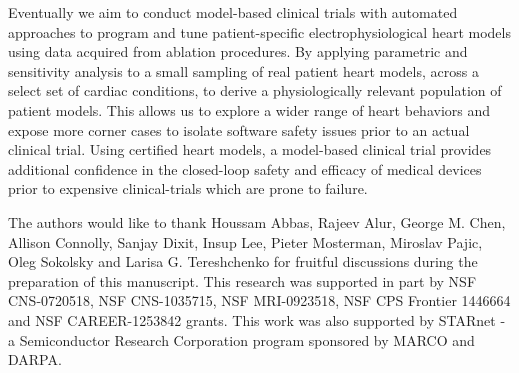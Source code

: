 Eventually we aim to conduct model-based clinical trials with automated approaches to program and tune patient-specific electrophysiological heart models using data acquired from ablation procedures. By applying parametric and sensitivity analysis to a small sampling of real patient heart models, across a select set of cardiac conditions, to derive a physiologically relevant population of patient models. This allows us to explore a wider range of heart behaviors and expose more corner cases to isolate software safety issues prior to an actual clinical trial. Using certified heart models, a model-based clinical trial provides additional confidence in the closed-loop safety and efficacy of medical devices prior to expensive clinical-trials which are prone to failure. 

\begin{acknowledgements}
The authors would like to thank Houssam Abbas, Rajeev Alur, George M. Chen, Allison Connolly, Sanjay Dixit, Insup Lee, Pieter Mosterman, Miroslav Pajic, Oleg Sokolsky and Larisa G. Tereshchenko for fruitful discussions during the preparation of this manuscript. This research was supported in part by NSF CNS-0720518, NSF CNS-1035715, NSF MRI-0923518, NSF CPS Frontier 1446664 and NSF CAREER-1253842 grants. This work was also supported by STARnet - a Semiconductor Research Corporation program sponsored by MARCO and DARPA.
\end{acknowledgements}
